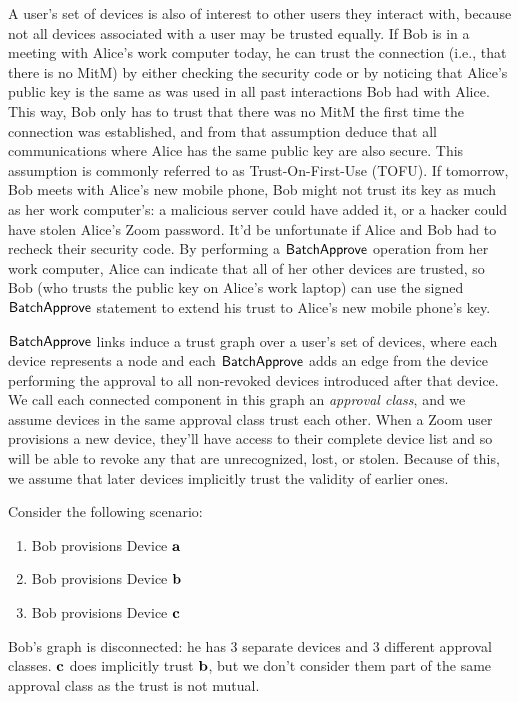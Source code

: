 A user's set of devices is also of interest to other users they interact with, because not all
devices associated with a user may be trusted equally. If Bob is in a meeting with Alice's work
computer today, he can trust the connection (i.e., that there is no MitM) by either checking the
security code or by noticing that Alice's public key is the same as was used in all past
interactions Bob had with Alice. This way, Bob only has to trust that there was no MitM the first
time the connection was established, and from that assumption deduce that all communications where
Alice has the same public key are also secure. This assumption is commonly referred to as
Trust-On-First-Use (TOFU). If tomorrow, Bob meets with Alice's new mobile phone, Bob might not trust
its key as much as her work computer's: a malicious server could have added it, or a hacker could
have stolen Alice's Zoom password. It'd be unfortunate if Alice and Bob had to recheck their
security code. By performing a $\mathsf{BatchApprove}{}$ operation from her work computer, Alice can
indicate that all of her other devices are trusted, so Bob (who trusts the public key on Alice's
work laptop) can use the signed $\mathsf{BatchApprove}{}$ statement to extend his trust to Alice's new
mobile phone's key.

$\mathsf{BatchApprove}{}$ links induce a trust graph over a user's set of devices, where each device
represents a node and each $\mathsf{BatchApprove}{}$ adds an edge from the device performing the approval to
all non-revoked devices introduced after that device. We call each connected component in this graph
an \textit{approval class}, and we assume devices in the same approval class trust each other. When
a Zoom user provisions a new device, they'll have access to their complete device list and so will
be able to revoke any that are unrecognized, lost, or stolen. Because of this, we assume that later
devices implicitly trust the validity of earlier ones.

Consider the following scenario:
\begin{enumerate}
\item Bob provisions Device $\mathbf{a}$
\item Bob provisions Device $\mathbf{b}$
\item Bob provisions Device $\mathbf{c}$
\end{enumerate}

Bob's graph is disconnected: he has 3 separate devices and 3 different approval classes. $\mathbf{c}$
does implicitly trust $\mathbf{b}$, but we don't consider them part of the same approval class as the
trust is not mutual.

